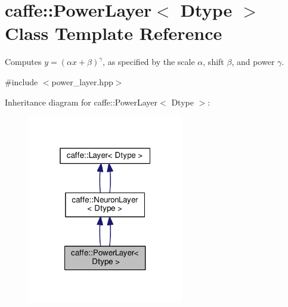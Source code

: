 \hypertarget{classcaffe_1_1_power_layer}{}\section{caffe\+:\+:Power\+Layer$<$ Dtype $>$ Class Template Reference}
\label{classcaffe_1_1_power_layer}


Computes $ y = (\alpha x + \beta) ^ \gamma $, as specified by the scale $ \alpha $, shift $ \beta $, and power $ \gamma $.  




{\ttfamily \#include $<$power\+\_\+layer.\+hpp$>$}



Inheritance diagram for caffe\+:\+:Power\+Layer$<$ Dtype $>$\+:
\nopagebreak
\begin{figure}[H]
\begin{center}
\leavevmode
\includegraphics[width=193pt]{classcaffe_1_1_power_layer__inherit__graph}
\end{center}
\end{figure}
